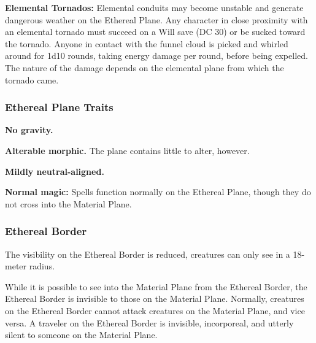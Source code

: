 \textbf{Elemental Tornados:} Elemental conduits may become unstable and generate dangerous weather on the Ethereal Plane. Any character in close proximity with an elemental tornado must succeed on a Will save (DC 30) or be sucked toward the tornado. Anyone in contact with the funnel cloud is picked and whirled around for 1d10 rounds, taking energy damage per round, before being expelled. The nature of the damage depends on the elemental plane from which the tornado came.


\subsubsection{Ethereal Plane Traits}
\begin{itemize*}
\item \textbf{No gravity.}
\item \textbf{Alterable morphic.} The plane contains little to alter, however.
\item \textbf{Mildly neutral-aligned.}
\item \textbf{Normal magic:} Spells function normally on the Ethereal Plane, though they do not cross into the Material Plane.
\end{itemize*}

\subsubsection{Ethereal Border}
The visibility on the Ethereal Border is reduced, creatures can only see in a 18-meter radius.

While it is possible to see into the Material Plane from the Ethereal Border, the Ethereal Border is invisible to those on the Material Plane. Normally, creatures on the Ethereal Border cannot attack creatures on the Material Plane, and vice versa. A traveler on the Ethereal Border is invisible, incorporeal, and utterly silent to someone on the Material Plane.

